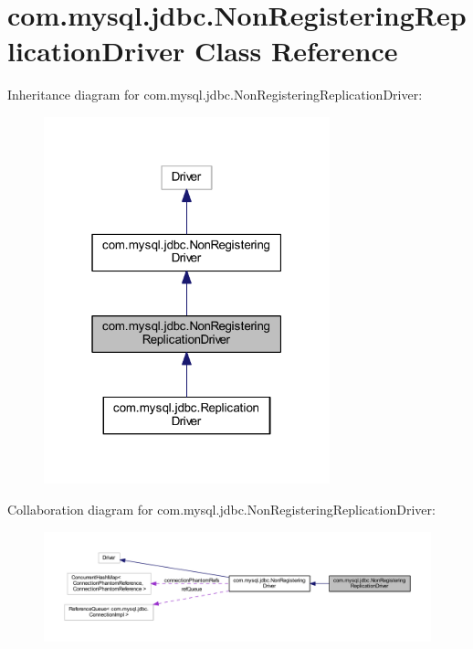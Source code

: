 \hypertarget{classcom_1_1mysql_1_1jdbc_1_1_non_registering_replication_driver}{}\section{com.\+mysql.\+jdbc.\+Non\+Registering\+Replication\+Driver Class Reference}
\label{classcom_1_1mysql_1_1jdbc_1_1_non_registering_replication_driver}


Inheritance diagram for com.\+mysql.\+jdbc.\+Non\+Registering\+Replication\+Driver\+:
\nopagebreak
\begin{figure}[H]
\begin{center}
\leavevmode
\includegraphics[width=235pt]{classcom_1_1mysql_1_1jdbc_1_1_non_registering_replication_driver__inherit__graph}
\end{center}
\end{figure}


Collaboration diagram for com.\+mysql.\+jdbc.\+Non\+Registering\+Replication\+Driver\+:
\nopagebreak
\begin{figure}[H]
\begin{center}
\leavevmode
\includegraphics[width=350pt]{classcom_1_1mysql_1_1jdbc_1_1_non_registering_replication_driver__coll__graph}
\end{center}
\end{figure}
